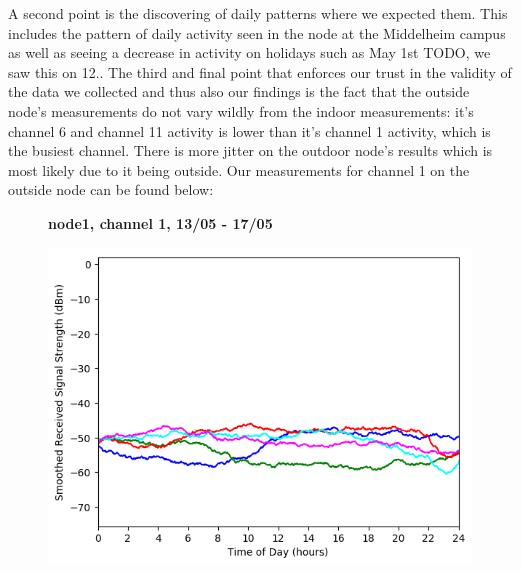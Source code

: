 A second point is the discovering of daily patterns where we expected them. This includes the pattern of daily activity seen in the node at the Middelheim campus as well as seeing a decrease in activity on holidays such as May 1st TODO, we saw this on 12..
The third and final point that enforces our trust in the validity of the data we collected and thus also our findings is the fact that the outside node's measurements do not vary wildly from the indoor measurements: it's channel 6 and channel 11 activity is lower than it's channel 1 activity, which is the busiest channel. There is more jitter on the outdoor node's results which is most likely due to it being outside. Our measurements for channel 1 on the outside node can be found below:\\
\begin{figure}[h!]
    \centering
    \textbf{node1, channel 1, 13/05 - 17/05}\par\medskip
	\includegraphics[scale=0.5]{images/2_4_GHz/node1_2017-05-17_chan1_image.png}
\end{figure} \newpage

